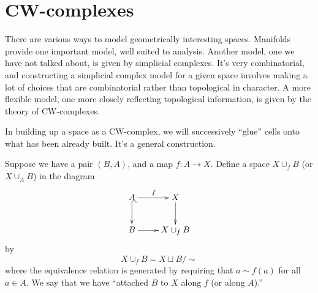 \section{CW-complexes}

There are various ways to model geometrically interesting spaces. 
Manifolds provide one important model, well suited to analysis.  
Another model, one we have not talked 
about, is given by simplicial complexes. It's very combinatorial,
and constructing a simplicial complex model for a given space involves
making a lot of choices that are combinatorial rather than topological
in character. A more flexible model, one more closely reflecting topological
information, is given by the theory of CW-complexes. 

In building up a space as a CW-complex, we will successively ``glue'' cells
onto what has been already built. It's a general construction. 

Suppose we have a pair $(B,A)$, and a map $f:A\to X$. Define a space
$X\cup_f B$ (or $X\cup_A B$) in the diagram
\begin{equation*}
\xymatrix{A\ar[r]^f\ar@{^(->}[d] & X\ar[d]\\
B\ar[r] & X\cup_f B}
\end{equation*}
by
\[
X\cup_f B=X\sqcup B/\sim
\]
where the equivalence relation is generated by requiring that $a\sim f(a)$ 
for all $a\in A$. We say that we have ``attached $B$ to $X$ along $f$ (or 
along $A$).'' 

